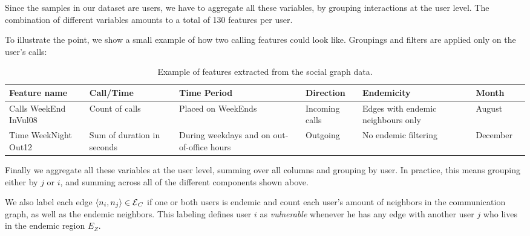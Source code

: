 
Since the samples in our dataset are users, we have to aggregate all these variables, by grouping interactions at the user level. The combination of different variables amounts to a total of 130 features per user.

To illustrate the point, we show a small example of how two calling features could look like. Groupings and filters are applied only on the user's calls:

\begin{table}[ht]
	\caption{Example of features extracted from the social graph data.}\label{tab:data_example}
	\footnotesize
	\centering
	\begin{tabular} {|p{1.5cm}|p{1.5cm}|p{2cm}|p{1.5cm}|p{2cm}|p{1.5cm}|p{1cm}}
		\hline
		Feature name & Call/Time & Time Period & Direction & Endemicity & Month\\
		\hline
		Calls WeekEnd InVul08       & Count of calls & Placed on WeekEnds & Incoming calls & Edges with endemic neighbours only & August\\
		\hline
		Time WeekNight Out12 & Sum of duration in seconds & During weekdays and on out-of-office hours & Outgoing   & No endemic filtering   & December \\
		\hline
	\end{tabular}
\end{table}



Finally we aggregate all these variables at the user level, summing over all columns and grouping by user.
In practice, this means grouping either by $j$ or $i$, and summing across all of the different components shown above.

We also label each edge $\left< n_i, n_j \right> \in \operatorname{\mathcal{E}}_C$ if one or both users is endemic and count each user's amount of neighbors in the communication graph, as well as the endemic neighbors.
This labeling defines user $i$ as \textit{vulnerable} whenever he has any edge with another user $j$ who lives in the endemic region $E_Z$.


